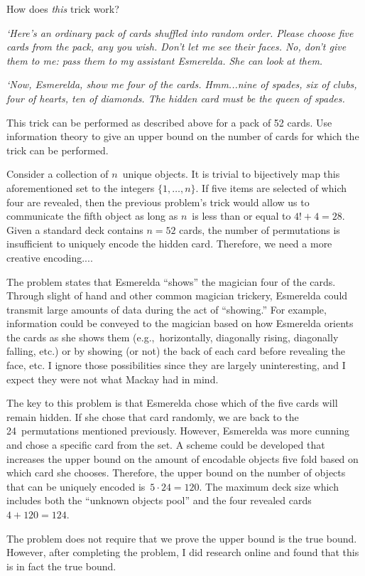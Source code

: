 \newpage
\begin{problem}{15}{6}
  How does \textit{this} trick work?
  
  \textnormal{\textit{`Here's an ordinary pack of cards shuffled into random order.  Please choose five cards from the pack, any you wish. Don't let me see their faces. No, don't give them to me: pass them to my assistant Esmerelda.  She can look at them.}}
  
  \textnormal{\textit{`Now, Esmerelda, show me four of the cards.  Hmm...nine of spades, six of clubs, four of hearts, ten of diamonds. The hidden card must be the queen of spades.}}
  
  This trick can be performed as described above for a pack of 52 cards.  Use information theory to give an upper bound on the number of cards for which the trick can be performed.
\end{problem}

Consider a collection of $n$~unique objects.  It is trivial to bijectively map this aforementioned set to the integers $\{1,\ldots,n\}$. If five items are selected of which four are revealed, then the previous problem's trick would allow us to communicate the fifth object as long as $n$~is less than or equal to ${4! + 4 = 28}$.  Given a standard deck contains $n=52$ cards, the number of permutations is insufficient to uniquely encode the hidden card.  Therefore, we need a more creative encoding....

The problem states that Esmerelda ``shows'' the magician four of the cards.  Through slight of hand and other common magician trickery, Esmerelda could transmit large amounts of data during the act of ``showing.''  For example, information could be conveyed to the magician based on how Esmerelda orients the cards as she shows them (e.g.,~horizontally, diagonally rising, diagonally falling, etc.) or by showing (or not) the back of each card before revealing the face, etc.  I ignore those possibilities since they are largely uninteresting, and I expect they were not what Mackay had in mind.

The key to this problem is that Esmerelda chose which of the five cards will remain hidden.  If she chose that card randomly, we are back to the 24~permutations mentioned previously.  However, Esmerelda was more cunning and chose a specific card from the set.  A scheme could be developed that increases the upper bound on the amount of encodable objects five fold based on which card she chooses.  Therefore, the upper bound on the number of objects that can be uniquely encoded is~${5\cdot24=120}$.  The maximum deck size which includes both the ``unknown objects pool'' and the four revealed cards~${4 + 120 = \boxed{124}}$.

The problem does not require that we prove the upper bound is the true bound.  However, after completing the problem, I did research online and found that this is in fact the true bound.
